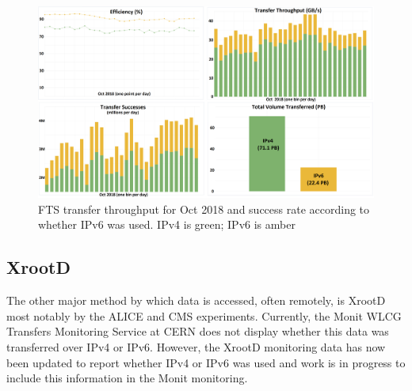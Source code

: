 \begin{figure}[t]
\centering
\includegraphics[width=13cm]{FTS-IPv6-figure-revised.png}
\caption{FTS transfer throughput for Oct 2018 and success rate according to whether IPv6 was used. IPv4 is green; IPv6 is amber}
\label{fig:fts}
\end{figure}

\subsection{XrootD}
The other major method by which data is accessed, often remotely, is XrootD most notably by the ALICE and CMS experiments. Currently, the Monit WLCG Transfers Monitoring Service at CERN %
does not display whether this data was transferred over IPv4 or IPv6. However, the XrootD monitoring data has now been updated to report whether IPv4 or IPv6 was used %
and work is in progress to include this information in the Monit monitoring.


